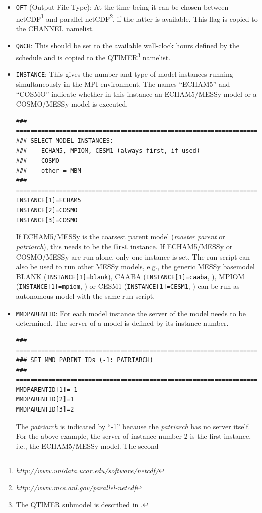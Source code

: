 \documentclass[11pt,twoside]{article}
\begin{document}
\begin{itemize}
\item \verb|OFT| (Output File Type): At the time being it can be chosen between
 netCDF\footnote{\it http://www.unidata.ucar.edu/software/netcdf/} and 
parallel-netCDF\footnote{\it http://www.mcs.anl.gov/parallel-netcdf},
 if the latter is available. This flag is copied to 
the CHANNEL namelist.
\item \verb|QWCH|: This should be set to the available wall-clock
hours defined by the schedule and is copied to the QTIMER\footnote{The
QTIMER submodel is described in  
\cite{Joeckel10a}.}  namelist.
\item \verb|INSTANCE|: This gives the number and type of model instances
running simultaneously in the MPI environment. The names ``ECHAM5''
and ``COSMO'' indicate whether in this instance an ECHAM5/MESSy model
or a COSMO/MESSy  model is executed.
\begin{verbatim}
### =========================================================================
### SELECT MODEL INSTANCES: 
###  - ECHAM5, MPIOM, CESM1 (always first, if used)
###  - COSMO
###  - other = MBM
### =========================================================================
INSTANCE[1]=ECHAM5
INSTANCE[2]=COSMO
INSTANCE[3]=COSMO
\end{verbatim}
If ECHAM5/MESSy is the coarsest parent model ({\it master parent} or
{\it patriarch}), this needs
to be the {\bf first} instance.
If ECHAM5/MESSy or COSMO/MESSy are run alone, only one instance is set.
The run-script can also be used to run other MESSy models, e.g., the
generic MESSy basemodel BLANK (\verb|INSTANCE[1]=blank|), CAABA
(\verb|INSTANCE[1]=caaba|, \cite{Sander2011}),
 MPIOM (\verb|INSTANCE[1]=mpiom|, \cite{Pozzer11b}) or CESM1 (\verb|INSTANCE[1]=CESM1|, \cite{Baumgaertner2016}) can be
 run as autonomous model with the same run-script.
\item \verb|MMDPARENTID|: For each model instance  the server of the model needs 
to be determined. The server of a model is defined by its instance number.
\begin{verbatim}
### =========================================================================
### SET MMD PARENT IDs (-1: PATRIARCH)
### =========================================================================
MMDPARENTID[1]=-1
MMDPARENTID[2]=1
MMDPARENTID[3]=2
\end{verbatim}
The {\it patriarch} is indicated by ``-1'' because 
the {\it patriarch} has no server itself. 
For the above example, the server of instance number 2
 is the first instance, i.e., the ECHAM5/MESSy model. The second

\end{itemize}
\end{document}
